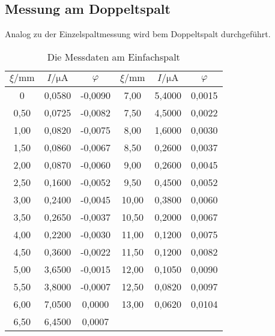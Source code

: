 \subsection{Messung am Doppeltspalt}
Analog zu der Einzelspaltmessung wird bem Doppeltspalt durchgeführt.
\begin{table}[H]
    \centering
    \caption{Die Messdaten am Einfachspalt}
    \label{tab:einzel}
    \begin{tabular}{| c | c |c||c|c|c| }
    \toprule
    $\xi/\mathrm{mm}$ &$I/\mathrm{\mu A}$  &  $\varphi$&$\xi/\mathrm{mm}$ &$I/\mathrm{\mu A}$  &  $\varphi$ \\
    \midrule
    0	    &0,0580	& -0,0090	& 7,00   & 5,4000 & 0,0015\\
    0,50	&0,0725	& -0,0082	& 7,50   & 4,5000 & 0,0022\\
    1,00	&0,0820	& -0,0075	& 8,00   & 1,6000 & 0,0030\\
    1,50	&0,0860	& -0,0067	& 8,50   & 0,2600 & 0,0037\\
    2,00	&0,0870	& -0,0060	& 9,00   & 0,2600 & 0,0045\\
    2,50	&0,1600	& -0,0052	& 9,50   & 0,4500 & 0,0052\\
    3,00	&0,2400	& -0,0045	& 10,00  & 0,3800 & 0,0060\\
    3,50	&0,2650	& -0,0037	& 10,50  & 0,2000 & 0,0067\\
    4,00	&0,2200	& -0,0030	& 11,00  & 0,1200 & 0,0075\\
    4,50	&0,3600	& -0,0022	& 11,50  & 0,1200 & 0,0082\\
    5,00	&3,6500	& -0,0015	& 12,00  & 0,1050 & 0,0090\\
    5,50	&3,8000	& -0,0007	& 12,50  & 0,0820 & 0,0097\\
    6,00    &7,0500 &  0,0000	& 13,00  & 0,0620 & 0,0104\\
    6,50	&6,4500	&  0,0007 & & \\			
 

    \bottomrule
    \end{tabular}
  \end{table}
  \noindent

